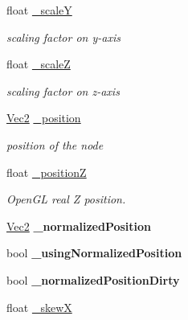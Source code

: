 \begin{DoxyCompactItemize}
\mbox{\label{classNode_a7996e5290ee0cf1e4ba4e427144c4832}} 
float \hyperlink{classNode_a7996e5290ee0cf1e4ba4e427144c4832}{\+\_\+scaleY}
\begin{DoxyCompactList}\small\item\em scaling factor on y-\/axis \end{DoxyCompactList}\item 
\mbox{\label{classNode_a52f8067ae8bab452356194c68c680af0}} 
float \hyperlink{classNode_a52f8067ae8bab452356194c68c680af0}{\+\_\+scaleZ}
\begin{DoxyCompactList}\small\item\em scaling factor on z-\/axis \end{DoxyCompactList}\item 
\mbox{\label{classNode_a3b3dff369c98537eeeab4c0bcbf3a69f}} 
\hyperlink{classVec2}{Vec2} \hyperlink{classNode_a3b3dff369c98537eeeab4c0bcbf3a69f}{\+\_\+position}
\begin{DoxyCompactList}\small\item\em position of the node \end{DoxyCompactList}\item 
\mbox{\label{classNode_a362654a7f9a70f2ccaf68934d3000fa5}} 
float \hyperlink{classNode_a362654a7f9a70f2ccaf68934d3000fa5}{\+\_\+positionZ}
\begin{DoxyCompactList}\small\item\em Open\+GL real Z position. \end{DoxyCompactList}\item 
\mbox{\label{classNode_a0cb5a92303d79bc8a9147c46f363ef28}} 
\hyperlink{classVec2}{Vec2} {\bfseries \+\_\+normalized\+Position}
\item 
\mbox{\label{classNode_ad9fde0edd4afa1ad63ab47ffd05b8f4f}} 
bool {\bfseries \+\_\+using\+Normalized\+Position}
\item 
\mbox{\label{classNode_a01b14cb27650511f74aed00fde0de0e0}} 
bool {\bfseries \+\_\+normalized\+Position\+Dirty}
\item 
\mbox{\label{classNode_a4725c588669f1af7240553cb1d433bdf}} 
float \hyperlink{classNode_a4725c588669f1af7240553cb1d433bdf}{\+\_\+skewX}

\end{DoxyCompactItemize}
